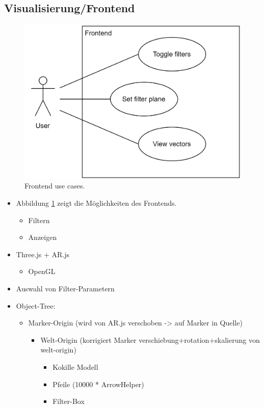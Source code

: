 \subsection{Visualisierung/Frontend}

\begin{figure}
	\centering
	\includegraphics[width=.75\linewidth]{images/frontend/UseCases}
	\caption{Frontend use cases.}
	\label{fig:frontendUseCase}
\end{figure}

\begin{itemize}
	\item Abbildung \ref{fig:frontendUseCase} zeigt
		die Möglichkeiten des Frontends.
	\begin{itemize}
		\item Filtern
		\item Anzeigen
	\end{itemize}
	
	\item Three.js + AR.js
	\begin{itemize}
		\item OpenGL
	\end{itemize}

	\item Auswahl von Filter-Parametern
	\item Object-Tree:
	\begin{itemize}
		\item Marker-Origin (wird von AR.js verschoben -> auf Marker in Quelle)
		\begin{itemize}
			\item Welt-Origin (korrigiert Marker verschiebung+rotation+skalierung von welt-origin)
			\begin{itemize}				
				\item Kokille Modell
				\item Pfeile (10000 * ArrowHelper)
				\item Filter-Box
			\end{itemize}
		\end{itemize}
	\end{itemize}
\end{itemize}




